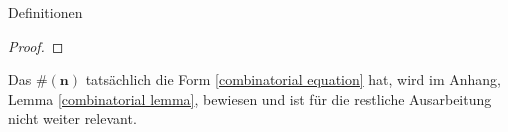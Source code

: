 \begin{section}{Definitionen}
\begin{proof}
\end{proof}
\begin{Bemerkung}
    \label{combinatorial bemerkung}
    Das $\#(\textbf{n})$ tatsächlich die Form \ref{combinatorial equation} hat, wird im Anhang, Lemma \ref{combinatorial lemma}, bewiesen und ist für die restliche Ausarbeitung nicht weiter relevant.
\end{Bemerkung}
\end{section}